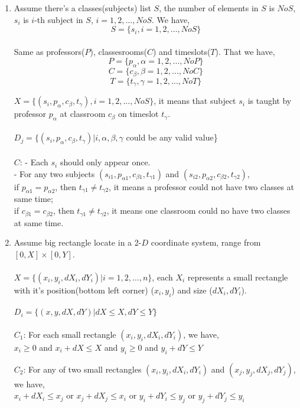 \documentclass{article}
\begin{document}
\begin{enumerate}
\item
Assume there's a classes(subjects) list $S$, the number of elements in $S$ is $NoS$, $s_i$ is $i$-th subject in $S$, $i=1,2,\dots,NoS$. We have, \\
$$ S = \{s_i, i=1,2,\dots,NoS\} $$ \\
Same as professors($P$), classesrooms($C$) and timeslots($T$). That we have,
$$ P = \{p_\alpha, \alpha=1,2,\dots,NoP\} $$ 
$$ C = \{c_\beta, \beta=1,2,\dots,NoC\} $$ 
$$ T = \{t_\gamma, \gamma=1,2,\dots,NoT\} $$ 

$X = \{ (s_i, p_\alpha, c_\beta, t_\gamma), i=1,2,\dots,NoS\}$, it means that subject $s_i$ is taught by professor $p_\alpha$ at classroom $c_\beta$ on timeslot $t_\gamma$. \\ \\
$D_j = \{ (s_i, p_\alpha, c_\beta, t_\gamma) | i,\alpha,\beta,\gamma$ could be any valid value\} \\ \\
$C$: - Each $s_i$ should only appear once. \\
- For any two subjects $(s_{i1}, p_{\alpha1}, c_{\beta1}, t_{\gamma1})$ and $(s_{i2}, p_{\alpha2}, c_{\beta2}, t_{\gamma2})$, \\
if $p_{\alpha1}=p_{\alpha2}$, then $t_{\gamma1} \neq t_{\gamma2}$, it means a professor could not have two classes at same time; \\
if $c_{\beta1}=c_{\beta2}$, then $t_{\gamma1} \neq t_{\gamma2}$, it means one classroom could no have two classes at same time.

\item
Assume big rectangle locate in a 2-$D$ coordinate system, range from $[0,X]\times[0,Y]$. \\ \\
$X = \{(x_i,y_i,dX_i,dY_i) | i=1,2,\dots,n\}$, each $X_i$ represents a small rectangle with it's position(bottom left corner) ($x_i,y_i$) and size ($dX_i,dY_i$). \\ \\
$D_i = \{(x,y,dX,dY) | dX \leqslant X, dY \leqslant Y\}$ \\ \\
$C_1$: For each small rectangle $(x_i,y_i,dX_i,dY_i)$, we have, \\
$ x_i \geqslant 0 $ and 
$ x_i+dX \leqslant X $ and
$ y_i \geqslant 0 $ and 
$ y_i+dY \leqslant Y $

$C_2$: For any of two small rectangles $(x_i,y_i,dX_i,dY_i)$ and $(x_j,y_j,dX_j,dY_j)$, we have, \\
$ x_i + dX_i \leqslant x_j $ or 
$ x_j + dX_j \leqslant x_i $ or 
$ y_i + dY_i \leqslant y_j $ or 
$ y_j + dY_j \leqslant y_i $






\end{enumerate}
\end{document}
